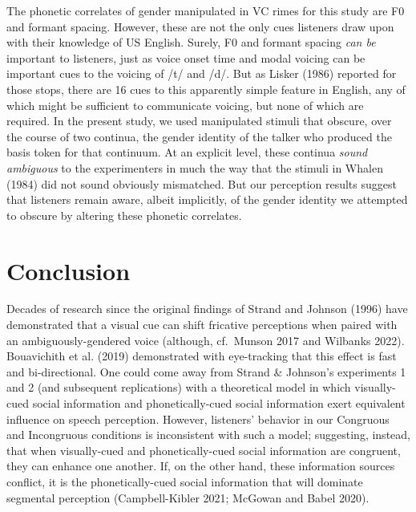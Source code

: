 \documentclass[
  letterpaper,
  DIV=11,
  numbers=noendperiod]{scrartcl}
\begin{document}
The phonetic correlates of gender manipulated in VC rimes for this study
are F0 and formant spacing. However, these are not the only cues
listeners draw upon with their knowledge of US English. Surely, F0 and
formant spacing \emph{can be} important to listeners, just as voice
onset time and modal voicing can be important cues to the voicing of /t/
and /d/. But as Lisker (1986) reported for those stops, there are 16
cues to this apparently simple feature in English, any of which might be
sufficient to communicate voicing, but none of which are required. In
the present study, we used manipulated stimuli that obscure, over the
course of two continua, the gender identity of the talker who produced
the basis token for that continuum. At an explicit level, these continua
\emph{sound ambiguous} to the experimenters in much the way that the
stimuli in Whalen (1984) did not sound obviously mismatched. But our
perception results suggest that listeners remain aware, albeit
implicitly, of the gender identity we attempted to obscure by altering
these phonetic correlates.

\section{Conclusion}\label{conclusion}

Decades of research since the original findings of Strand and Johnson
(1996) have demonstrated that a visual cue can shift fricative
perceptions when paired with an ambiguously-gendered voice (although,
cf.~Munson 2017 and Wilbanks 2022). Bouavichith et al. (2019)
demonstrated with eye-tracking that this effect is fast and
bi-directional. One could come away from Strand \& Johnson's experiments
1 and 2 (and subsequent replications) with a theoretical model in which
visually-cued social information and phonetically-cued social
information exert equivalent influence on speech perception. However,
listeners' behavior in our Congruous and Incongruous conditions is
inconsistent with such a model; suggesting, instead, that when
visually-cued and phonetically-cued social information are congruent,
they can enhance one another. If, on the other hand, these information
sources conflict, it is the phonetically-cued social information that
will dominate segmental perception (Campbell-Kibler 2021; McGowan and
Babel 2020).
\end{document}
